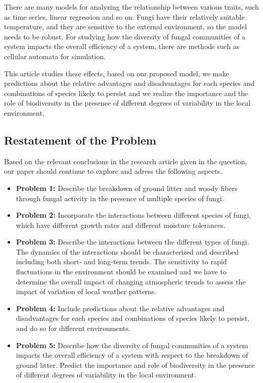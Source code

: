\documentclass{mcmthesis}
\begin{document}
There are many models for analyzing the relationship between various traits, such as time series, linear regression and so on. Fungi have their relatively suitable temperature, and they are sensitive to the external environment, so the model needs to be robust. For studying how the diversity of fungal communities of a system impacts the overall efficiency of a system, there are methods such as cellular automata for simulation. 

This article studies these effects, based on our proposed model, we make predictions about the relative advantages and disadvantages for each species and combinations of species likely to persist and we realize the importance and the role of biodiversity in the presence of different degrees of variability in the local environment.

\subsection{Restatement of the Problem}

Based on the relevant conclusions in the research article given in the question, our paper should continue to explore and adress the following aspects. 

\begin{itemize}
  \item \textbf{Problem 1:}
  Describe the breakdown of ground litter and woody fibers through fungal activity in the presence of multiple species of fungi.
  \item \textbf{Problem 2:}
  Incorporate the interactions between different species of fungi, which have different growth rates and different moisture tolerances.
  \item \textbf{Problem 3:}
  Describe the interactions between the different types of fungi. The dynamics of the interactions should be characterized and described including both short- and long-term trends. The sensitivity to rapid fluctuations in the environment should be examined and we have to determine the overall impact of changing atmospheric trends to assess the impact of variation of local weather patterns.
  \item \textbf{Problem 4:}
  Include predictions about the relative advantages and disadvantages for each species and combinations of species likely to persist, and do so for different environments.
  \item \textbf{Problem 5:}
  Describe how the diversity of fungal communities of a system impacts the overall efficiency of a system with respect to the breakdown of ground litter. Predict the importance and role of biodiversity in the presence of different degrees of variability in the local environment.
\end{itemize}
\end{document}
